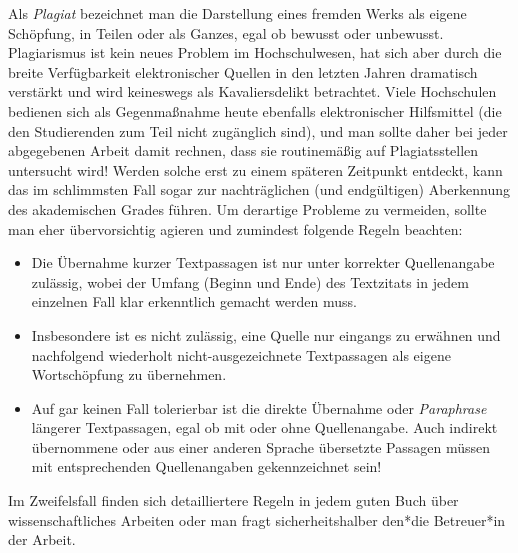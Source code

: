 Als \emph{Plagiat} bezeichnet man die Darstellung eines fremden Werks als eigene Schöpfung, in Teilen oder als
Ganzes, egal ob bewusst oder unbewusst. Plagiarismus ist kein neues Problem im Hochschulwesen, hat sich aber durch
die breite Verfügbarkeit elektronischer Quellen in den letzten Jahren dramatisch verstärkt und wird keineswegs als
Kavaliersdelikt betrachtet. Viele Hochschulen bedienen sich als Gegenmaßnahme heute ebenfalls elektronischer
Hilfsmittel (die den Studierenden zum Teil nicht zugänglich sind), und man sollte daher bei jeder abgegebenen Arbeit
damit rechnen, dass sie routinemäßig auf Plagiatsstellen untersucht wird! Werden solche erst zu einem späteren
Zeitpunkt entdeckt, kann das im schlimmsten Fall sogar zur nachträglichen (und endgültigen) Aberkennung des
akademischen Grades führen. Um derartige Probleme zu vermeiden, sollte man eher übervorsichtig agieren und zumindest
folgende Regeln beachten:
%
\begin{itemize}
\item
Die Übernahme kurzer Textpassagen ist nur unter korrekter Quellenangabe zulässig, wobei der Umfang (Beginn und Ende)
des Textzitats in jedem einzelnen Fall klar erkenntlich gemacht werden muss.
\item
Insbesondere ist es nicht zulässig, eine Quelle nur eingangs zu erwähnen und nachfolgend wiederholt
nicht-ausgezeichnete Textpassagen als eigene Wortschöpfung zu übernehmen.
\item
Auf gar keinen Fall tolerierbar ist die direkte Übernahme oder \emph{Paraphrase} längerer Textpassagen, egal ob mit
oder ohne Quellenangabe. Auch indirekt übernommene oder aus einer anderen Sprache übersetzte Passagen müssen mit
entsprechenden Quellenangaben gekennzeichnet sein!
\end{itemize}
%
Im Zweifelsfall finden sich detailliertere Regeln in jedem guten Buch über wissenschaftliches Arbeiten oder man fragt
sicherheitshalber den*die Betreuer*in der Arbeit.
